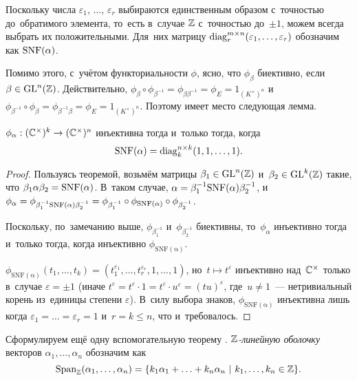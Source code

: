 \documentclass[a4paper,oneside]{article}
\begin{document}
Поскольку числа $\varepsilon_1$, $\ldots$, $\varepsilon_r$ выбираются единственным образом с~точностью
до~обратимого элемента, то~есть в~случае $\mathbb{Z}$ с~точностью до~$\pm 1$, можем всегда выбрать их положительными.
Для~них матрицу $\mathrm{diag}^{m \times n}_r(\varepsilon_1, \ldots, \varepsilon_r)$ обозначим как $\mathrm{SNF}(\alpha)$.

Помимо этого, с~учётом функториальности $\phi$, ясно, что $\phi_\beta$ биективно, если $\beta \in \mathrm{GL}^n(\mathbb{Z})$.
Действительно, $\phi_\beta \circ \phi_{\beta^{-1}} = \phi_{\beta \beta^{-1}} = \phi_E = 1_{(K^\times)^n}$
и~$\phi_{\beta^{-1}} \circ \phi_\beta = \phi_{\beta^{-1} \beta} = \phi_E = 1_{(K^\times)^n}$.
Поэтому имеет место следующая лемма.

\begin{lemma}
\label{lemma:injectivityOutOfSNF}
    $\phi_\alpha : (\mathbb{C}^\times)^k \rightarrow (\mathbb{C}^\times)^n$ инъективна тогда и~только тогда, когда
    $$
        \mathrm{SNF}(\alpha) = \mathrm{diag}^{n \times k}_k(1, 1, \ldots, 1).
    $$
\end{lemma}

\begin{proof}
    Пользуясь теоремой, возьмём матрицы $\beta_1 \in \mathrm{GL}^n(\mathbb{Z})$ и~$\beta_2 \in \mathrm{GL}^k(\mathbb{Z})$
    такие, что $\beta_1 \alpha \beta_2 = \mathrm{SNF}(\alpha)$.
    В~таком случае, $\alpha = \beta_1^{-1} \mathrm{SNF}(\alpha) \beta_2^{-1}$, и~$\phi_\alpha = \phi_{\beta_1^{-1} \mathrm{SNF}(\alpha) \beta_2^{-1}}
                                                                                      = \phi_{\beta_1^{-1}} \circ \phi_{\mathrm{SNF}(\alpha)} \circ \phi_{\beta_2^{-1}}$.

    Поскольку, по~замечанию выше, $\phi_{\beta_1^{-1}}$ и~$\phi_{\beta_2^{-1}}$ биективны, то~$\phi_\alpha$
    инъективно тогда и~только тогда, когда инъективно $\phi_{\mathrm{SNF(\alpha)}}$.

    $\phi_{\mathrm{SNF(\alpha)}}(t_1, \ldots, t_k) = (t_1^{\varepsilon_1}, \ldots, t_r^{\varepsilon_r}, 1, \ldots, 1)$,
    но~$t \mapsto t^\varepsilon$ инъективно над~$\mathbb{C}^\times$ только в~случае $\varepsilon = \pm 1$
    (иначе $t^\varepsilon = t^\varepsilon \cdot 1 = t^\varepsilon \cdot u^\varepsilon = (tu)^\varepsilon$,
     где~$u \neq 1$~— нетривиальный корень из~единицы степени $\varepsilon$).
    В~силу выбора знаков, $\phi_{\mathrm{SNF(\alpha)}}$ инъективна лишь когда $\varepsilon_1 = \ldots = \varepsilon_r = 1$
    и~$r = k \leq n$, что и~требовалось.
\end{proof}

Сформулируем ещё одну вспомогательную теорему \cite{TsikhSad14}.
\textit{$\mathbb{Z}$-линейную оболочку} векторов $\alpha_1, \ldots, \alpha_n$ обозначим как
$$
    \mathrm{Span}_{\mathbb{Z}}(\alpha_1, \ldots, \alpha_n) = \{ k_1 \alpha_1 + \ldots + k_n \alpha_n \ | \ k_1, \ldots, k_n \in \mathbb{Z} \}.
$$
\end{document}
